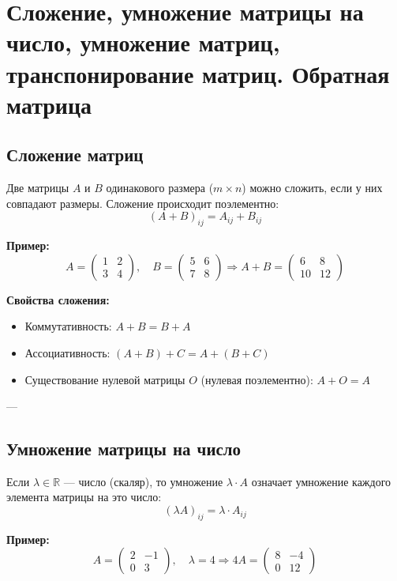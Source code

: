 \section{Сложение, умножение матрицы на число, умножение матриц, транспонирование матриц. Обратная матрица}

\subsection*{Сложение матриц}

Две матрицы $A$ и $B$ одинакового размера ($m \times n$) можно сложить, если у них совпадают размеры. Сложение происходит поэлементно:
\[
(A + B)_{ij} = A_{ij} + B_{ij}
\]

\textbf{Пример:}
\[
A =
\begin{pmatrix}
1 & 2 \\
3 & 4
\end{pmatrix}, \quad
B =
\begin{pmatrix}
5 & 6 \\
7 & 8
\end{pmatrix}
\Rightarrow
A + B =
\begin{pmatrix}
6 & 8 \\
10 & 12
\end{pmatrix}
\]

\textbf{Свойства сложения:}
\begin{itemize}
  \item Коммутативность: $A + B = B + A$
  \item Ассоциативность: $(A + B) + C = A + (B + C)$
  \item Существование нулевой матрицы $O$ (нулевая поэлементно): $A + O = A$
\end{itemize}

---

\subsection*{Умножение матрицы на число}

Если $\lambda \in \mathbb{R}$ — число (скаляр), то умножение $\lambda \cdot A$ означает умножение каждого элемента матрицы на это число:
\[
(\lambda A)_{ij} = \lambda \cdot A_{ij}
\]

\textbf{Пример:}
\[
A =
\begin{pmatrix}
2 & -1 \\
0 & 3
\end{pmatrix}, \quad \lambda = 4
\Rightarrow
4A =
\begin{pmatrix}
8 & -4 \\
0 & 12
\end{pmatrix}
\]

